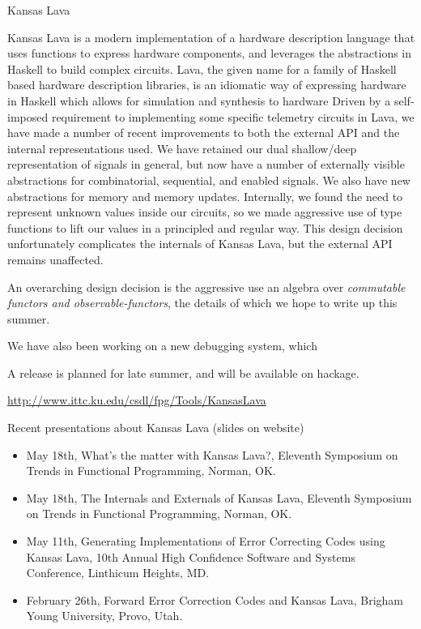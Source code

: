 \documentclass{article}
\begin{document}
\begin{hcarentry}{Kansas Lava}
\makeheader

Kansas Lava is a modern implementation of a hardware description language
that uses functions to express hardware components,
and leverages the abstractions in Haskell to build complex circuits. 
Lava, 
the given name for a family of Haskell based hardware description libraries,
is an idiomatic way of expressing hardware in Haskell which allows for simulation and
synthesis to hardware
Driven by a self-imposed requirement to implementing some specific telemetry circuits in Lava,
we have made a number of recent improvements to both the external API
and the internal representations used. 
We have retained our dual shallow/deep
representation of signals in general, but now have a number of externally visible
abstractions for combinatorial, sequential, and enabled signals.
We also have new abstractions for memory and memory updates.
Internally, we found the need to represent unknown values inside our circuits, 
so we made aggressive use of type functions to lift our values in a principled
and regular way. This design decision unfortunately 
complicates the internals of Kansas Lava, but the external
API remains unaffected.

An overarching design decision is the aggressive use an algebra over {\em commutable functors and observable-functors\/}, the details of which we hope to write up this summer.

We have also been working on a new debugging system, which 

A release is planned for late summer, and will be available on hackage.

\FurtherReading
  \url{http://www.ittc.ku.edu/csdl/fpg/Tools/KansasLava}

Recent presentations about Kansas Lava (slides on website)
\begin{itemize}
\item May 18th, What's the matter with Kansas Lava?, Eleventh Symposium on Trends in Functional Programming, Norman, OK.
\item May 18th, The Internals and Externals of Kansas Lava, Eleventh Symposium on Trends in Functional Programming, Norman, OK.
\item May 11th, Generating Implementations of Error Correcting Codes using Kansas Lava, 10th Annual High Confidence  Software and Systems Conference, Linthicum Heights, MD.
\item February 26th, Forward Error Correction Codes and Kansas Lava, Brigham Young University, Provo, Utah.
\end{itemize}

\end{hcarentry}
\end{document}

